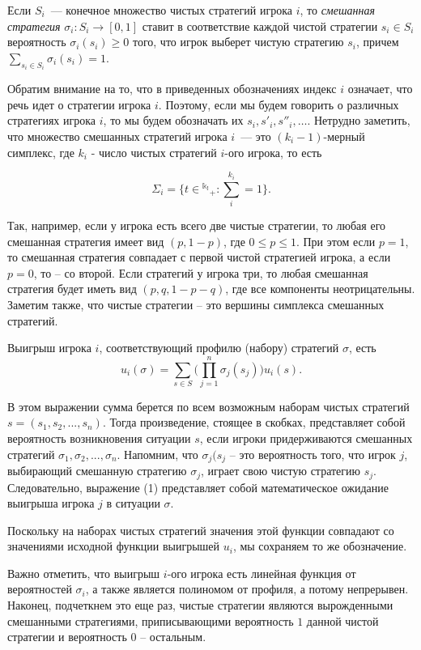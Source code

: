 \documentclass[12pt]{article}
\begin{document}
\begin{definition}
Если $S_i$~--- конечное множество чистых стратегий игрока $i$, то
{\it смешанная стратегия} $\sigma_i:S_i\to [0,1]$ ставит в
соответствие каждой чистой стратегии $s_i\in S_i$ вероятность
$\sigma_i(s_i)\ge 0$ того, что игрок выберет чистую стратегию
$s_i$, причем $\sum_{s_i\in S_i}\sigma_i(s_i)=1$.
\end{definition}

Обратим внимание на то, что в приведенных обозначениях индекс $i$
означает, что речь идет о стратегии игрока $i$. Поэтому, если мы
будем говорить о различных стратегиях игрока $i$, то мы будем
обозначать их $s_i,s'_i,s''_i,\ldots$. Нетрудно заметить, что
множество смешанных стратегий игрока $i$~--- это $(k_i-1)$-мерный
симплекс, где $k_i$ - число чистых стратегий $i$-ого игрока, то
есть

$$\Sigma_i=\{t\in\mathbb{^{k_i}}_+:\sum^{k_i}_i=1\}.$$

Так, например, если  у игрока есть всего две чистые стратегии, то
любая его смешанная стратегия имеет вид $(p,1-p)$, где
$0\leq{p}\leq1$. При этом если $p=1$, то смешанная стратегия
совпадает с первой чистой стратегией игрока, а если $p=0$, то --
со второй. Если стратегий у игрока три, то любая смешанная
стратегия будет иметь вид $(p,q,1-p-q)$, где все компоненты
неотрицательны. Заметим также, что чистые стратегии -- это вершины
симплекса смешанных стратегий.

Выигрыш игрока $i$, соответствующий профилю (набору) стратегий
$\sigma$, есть \begin{equation}\label{P1} u_i(\sigma)=\sum_{s\in
S}\biggl (\prod^n_{j=1}\sigma_j(s_j)\biggr)u_i(s). \end{equation}

В этом выражении сумма берется по всем возможным наборам чистых
стратегий $s=(s_1,s_2,...,s_n)$. Тогда произведение, стоящее в
скобках, представляет собой вероятность возникновения ситуации
$s$, если игроки придерживаются смешанных стратегий
$\sigma_1,\sigma_2, ... ,\sigma_n$. Напомним, что $\sigma_j(s_j$
-- это вероятность того, что игрок $j$, выбирающий смешанную
стратегию $\sigma_j$, играет свою чистую стратегию $s_j$.
Следовательно, выражение (1) представляет собой математическое
ожидание выигрыша игрока $j$ в ситуации $\sigma $.

Поскольку на наборах чистых стратегий значения этой функции
совпадают со значениями исходной функции выигрышей $u_i$, мы
сохраняем то же обозначение.

Важно отметить, что выигрыш $i$-ого игрока есть линейная функция
от вероятностей $\sigma_i$, а также является полиномом от профиля,
а потому непрерывен. Наконец, подчеткнем это еще раз, чистые
стратегии являются вырожденными смешанными стратегиями,
приписывающими вероятность $1$ данной чистой стратегии и
вероятность $0$ -- остальным.
\end{document}

